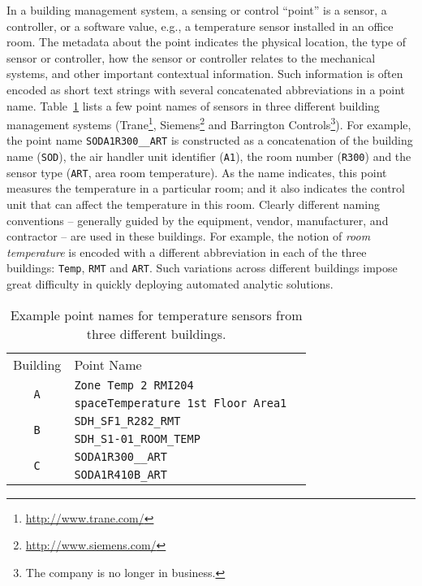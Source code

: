 In a building management system, a sensing or control ``point'' is a sensor,
a controller, or a software value, e.g., a temperature sensor
installed in an office room. The metadata about the point indicates the physical
location, the type of sensor or controller, how the sensor or controller relates
to the mechanical systems, and other important contextual information. Such information is often encoded as short
text strings with several concatenated abbreviations in a point name. Table~\ref{table:ex} lists
a few point names of sensors in three different building management systems
(Trane\footnote{\url{http://www.trane.com/}}, Siemens\footnote{\url{http://www.siemens.com/}}
and Barrington Controls\footnote{The company is no longer in business.}).
For example, the point name \texttt{SODA1R300\_\_ART} is constructed as a
concatenation of the building name (\texttt{SOD}), the air handler unit
identifier (\texttt{A1}), the room number (\texttt{R300}) and the sensor type
(\texttt{ART}, area room temperature). As the name indicates, this point measures
the temperature in a particular room; and it also indicates the control unit that
can affect the temperature in this room. Clearly different naming conventions --
generally guided by the equipment, vendor, manufacturer,
and contractor --
are used in these buildings. For example, the notion of {\em room temperature} is encoded
with a different abbreviation in each of the three buildings: \texttt{Temp}, \texttt{RMT} and \texttt{ART}.
Such variations across different buildings impose great difficulty in quickly deploying automated analytic
solutions.
\begin{table}[h]
\centering
\begin{tabular}{c|ll}
\cline{1-2}
Building & Point Name & \\
\cline{1-2}
\multirow{2}{*}{\texttt{A}}  & \texttt{Zone Temp 2 RMI204} &  \\
					& \texttt{spaceTemperature 1st Floor Area1} &  \\ \cline{1-2}
\multirow{2}{*}{\texttt{B}} & \texttt{SDH\_SF1\_R282\_RMT} &  \\
                     & \texttt{SDH\_S1-01\_ROOM\_TEMP} &  \\ \cline{1-2}
\multirow{2}{*}{\texttt{C}}  & \texttt{SODA1R300\_\_ART} &  \\
					  & \texttt{SODA1R410B\_ART} &  \\ \cline{1-2}
\end{tabular}
\caption{Example point names for temperature sensors from three different buildings.}
\label{table:ex}
\end{table}

